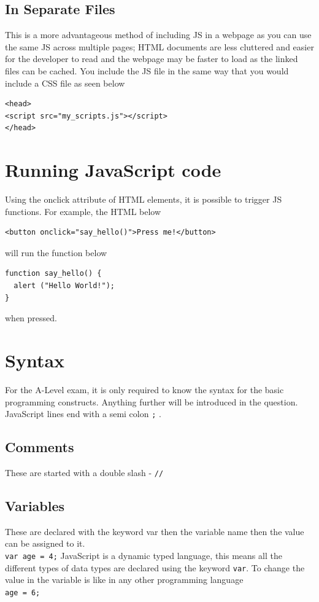 \documentclass{thomasClass}
\begin{document}
\subsection{In Separate Files}
This is a more advantageous method of including JS in a webpage as you can use the same JS across multiple pages; HTML documents are less cluttered and easier for the developer to read and the webpage may be faster to load as the linked files can be cached. You include the JS file in the same way that you would include a CSS file as seen below
\begin{Verbatim}[breaklines=true, breakanywhere=true]
<head>
<script src="my_scripts.js"></script>
</head>
\end{Verbatim}

\section{Running JavaScript code}
Using the onclick attribute of HTML elements, it is possible to trigger JS functions. For example, the HTML below
\begin{Verbatim}[breaklines=true, breakanywhere=true]
<button onclick="say_hello()">Press me!</button>
\end{Verbatim}
will run the function below
\begin{Verbatim}[breaklines=true, breakanywhere=true]
function say_hello() {
  alert ("Hello World!"); 
}
\end{Verbatim}
when pressed.

\section{Syntax}
For the A-Level exam, it is only required to know the syntax for the basic programming constructs. Anything further will be introduced in the question. JavaScript lines end with a semi colon \verb|;| .
\subsection{Comments}
These are started with a double slash - \verb|//|
\subsection{Variables}
These are declared with the keyword var then the variable name then the value can be assigned to it.\\
\verb|var age = 4;|
JavaScript is a dynamic typed language, this means all the different types of data types are declared using the keyword \verb|var|.
To change the value in the variable is like in any other programming language\\
\verb|age = 6;|
\end{document}
